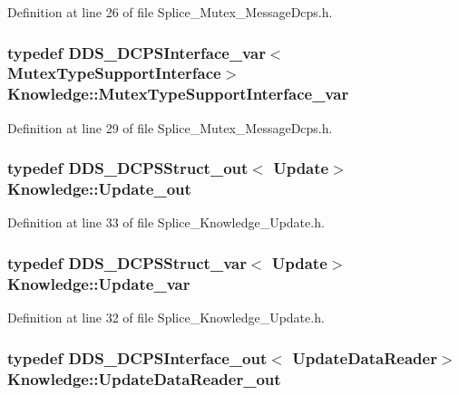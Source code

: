Definition at line 26 of file Splice\_\-Mutex\_\-MessageDcps.h.

\hypertarget{namespaceKnowledge_acaf157b3817dc52861f4ff75fcd3c2d4}{
\subsubsection[{MutexTypeSupportInterface\_\-var}]{\setlength{\rightskip}{0pt plus 5cm}typedef DDS\_\-DCPSInterface\_\-var$<$ {\bf MutexTypeSupportInterface}$>$ {\bf Knowledge::MutexTypeSupportInterface\_\-var}}}
\label{da/d50/namespaceKnowledge_acaf157b3817dc52861f4ff75fcd3c2d4}


Definition at line 29 of file Splice\_\-Mutex\_\-MessageDcps.h.

\hypertarget{namespaceKnowledge_ad202db76833fd4d8d342cb77dc4ea214}{
\subsubsection[{Update\_\-out}]{\setlength{\rightskip}{0pt plus 5cm}typedef DDS\_\-DCPSStruct\_\-out$<$ {\bf Update}$>$ {\bf Knowledge::Update\_\-out}}}
\label{da/d50/namespaceKnowledge_ad202db76833fd4d8d342cb77dc4ea214}


Definition at line 33 of file Splice\_\-Knowledge\_\-Update.h.

\hypertarget{namespaceKnowledge_a89381a78760c54e9d5d5021e068bfb45}{
\subsubsection[{Update\_\-var}]{\setlength{\rightskip}{0pt plus 5cm}typedef DDS\_\-DCPSStruct\_\-var$<$ {\bf Update}$>$ {\bf Knowledge::Update\_\-var}}}
\label{da/d50/namespaceKnowledge_a89381a78760c54e9d5d5021e068bfb45}


Definition at line 32 of file Splice\_\-Knowledge\_\-Update.h.

\hypertarget{namespaceKnowledge_a870e10104a88ced8aab4b5a2919cce46}{
\subsubsection[{UpdateDataReader\_\-out}]{\setlength{\rightskip}{0pt plus 5cm}typedef DDS\_\-DCPSInterface\_\-out$<$ {\bf UpdateDataReader}$>$ {\bf Knowledge::UpdateDataReader\_\-out}}}
\label{da/d50/namespaceKnowledge_a870e10104a88ced8aab4b5a2919cce46}


